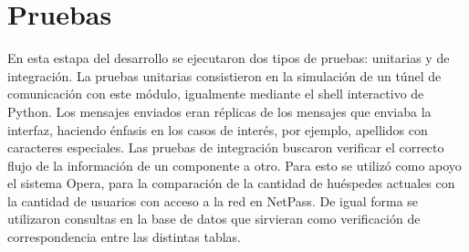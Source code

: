 \section{Pruebas}
	    En esta estapa del desarrollo se ejecutaron dos tipos de pruebas: unitarias y de integración. 
\newline
\newline
\indent La pruebas unitarias consistieron en la simulación de un túnel de comunicación con este módulo, igualmente mediante el shell interactivo de Python. Los mensajes enviados eran réplicas de los mensajes que enviaba la interfaz, haciendo énfasis en los casos de interés, por ejemplo, apellidos con caracteres especiales. 
\newline
\newline
\indent Las pruebas de integración buscaron verificar el correcto flujo de la información de un componente a otro. Para esto se utilizó como apoyo el sistema Opera, para la comparación de la cantidad de huéspedes actuales con la cantidad de usuarios con acceso a la red en NetPass. De igual forma se utilizaron consultas en la base de datos que sirvieran como verificación de correspondencia entre las distintas tablas.